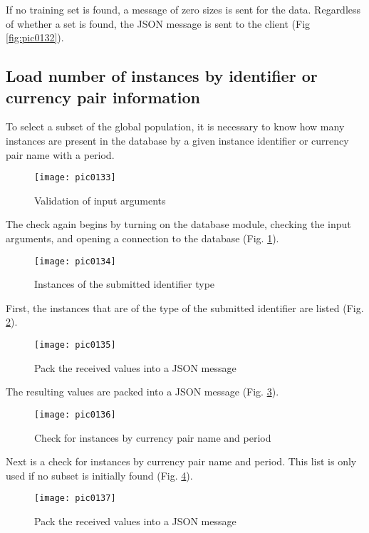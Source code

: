 If no training set is found, a message of zero sizes is sent for the data. Regardless of whether a set is found, the JSON message is sent to the client (Fig \ref{fig:pic0132}).

\subsection{Load number of instances by identifier or currency pair information}

To select a subset of the global population, it is necessary to know how many instances are present in the database by a given instance identifier or currency pair name with a period.

\begin{figure}[h]
\centering
\texttt{[image: pic0133]}
\caption{Validation of input arguments}
\label{fig:pic0133}
\end{figure}
\FloatBarrier

The check again begins by turning on the database module, checking the input arguments, and opening a connection to the database (Fig. \ref{fig:pic0133}).

\begin{figure}[h]
\centering
\texttt{[image: pic0134]}
\caption{Instances of the submitted identifier type}
\label{fig:pic0134}
\end{figure}
\FloatBarrier

First, the instances that are of the type of the submitted identifier are listed (Fig. \ref{fig:pic0134}).

\begin{figure}[h]
\centering
\texttt{[image: pic0135]}
\caption{Pack the received values into a JSON message}
\label{fig:pic0135}
\end{figure}
\FloatBarrier

The resulting values are packed into a JSON message (Fig. \ref{fig:pic0135}).

\begin{figure}[h]
\centering
\texttt{[image: pic0136]}
\caption{Check for instances by currency pair name and period}
\label{fig:pic0136}
\end{figure}
\FloatBarrier

Next is a check for instances by currency pair name and period. This list is only used if no subset is initially found (Fig. \ref{fig:pic0136}).

\begin{figure}[h]
\centering
\texttt{[image: pic0137]}
\caption{Pack the received values into a JSON message}
\label{fig:pic0137}
\end{figure}
\FloatBarrier

